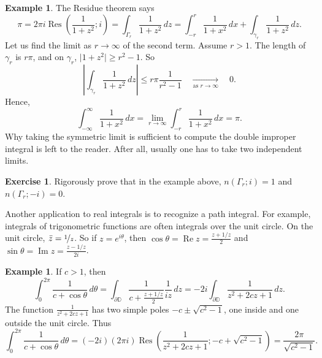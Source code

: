 \documentclass[12pt,openany]{book}
\renewcommand{\Re}{\operatorname{Re}}
\renewcommand{\Im}{\operatorname{Im}}
\newcommand{\sabs}[1]{\lvert {#1} \rvert}
\newcommand{\abs}[1]{\left\lvert {#1} \right\rvert}
\newcommand{\D}{{\mathbb{D}}}
\theoremstyle{plain}
\theoremstyle{remark}
\theoremstyle{definition}
\newenvironment{exbox}{%
    \def\FrameCommand{\vrule width 1pt \relax\hspace{10pt}}%
    \MakeFramed{\advance\hsize-\width\FrameRestore}%
}{%
    \endMakeFramed
}
\theoremstyle{exercise}
\newtheorem{exercise}{Exercise}[section]
\theoremstyle{example}
\newtheorem{example}[thm]{Example}
\begin{document}
\begin{example}
The Residue theorem says
\begin{equation*}
\pi 
=
2 \pi i \operatorname{Res}\left(\frac{1}{1+z^2};i\right) =
\int_{\Gamma_r} \frac{1}{1+z^2} \, dz
=
\int_{-r}^r \frac{1}{1+x^2} \, dx
+
\int_{\gamma_r} \frac{1}{1+z^2} \, dz .
\end{equation*}
Let us find the limit as $r \to \infty$ of the second term.
Assume $r > 1$.
The length of $\gamma_r$ is $r\pi$,
and on $\gamma_r$,
$\sabs{1+z^2} \geq r^2-1$.  So
\begin{equation*}
\abs{
\int_{\gamma_r} \frac{1}{1+z^2} \, dz 
}
\leq
r \pi \frac{1}{r^2-1}
\quad\underset{\text{as } r \to \infty}{\to}\quad 0 .
\end{equation*}
Hence,
\begin{equation*}
\int_{-\infty}^\infty
\frac{1}{1+x^2} \, dx
=
\lim_{r\to \infty} \int_{-r}^r 
\frac{1}{1+x^2} \, dx
= \pi .
\end{equation*}
Why taking the symmetric limit is sufficient to compute the double improper
integral is left to the reader.  After all, usually one has to
take two independent limits.
\end{example}

\begin{exbox}
\begin{exercise}
Rigorously prove that in the example above,
$n(\Gamma_r;i) = 1$ and
$n(\Gamma_r;-i) = 0$.
\end{exercise}
\end{exbox}

Another application to real integrals is to recognize 
a path integral.  For example, integrals of trigonometric functions
are often integrals over the unit circle.  On the unit
circle, $\bar{z} = \nicefrac{1}{z}$.  So if $z=e^{i\theta}$, then
$\cos \theta = \Re z = \frac{z+1/z}{2}$ and
$\sin \theta = \Im z = \frac{z-1/z}{2i}$.

\begin{example}
If $c > 1$, then
\begin{equation*}
\int_0^{2\pi} \frac{1}{c+\cos \theta} \, d\theta 
=
\int_{\partial \D} \frac{1}{c+\frac{z+1/z}{2}} \frac{1}{iz} \, dz
=
-2i
\int_{\partial \D} \frac{1}{z^2 + 2cz + 1} \, dz
.
\end{equation*}
The function $\frac{1}{z^2 + 2cz + 1}$ has two simple poles $-c \pm \sqrt{c^2-1}$,
one inside and one outside the unit circle.  Thus
\begin{equation*}
\int_0^{2\pi} \frac{1}{c+\cos \theta} \, d\theta 
=
(-2i)
(2 \pi i)
\operatorname{Res}
\left(\frac{1}{z^2 + 2cz + 1}; -c+\sqrt{c^2-1}\right)
=
\frac{2\pi}{\sqrt{c^2-1}}
.
\end{equation*}
\end{example}
\end{document}
